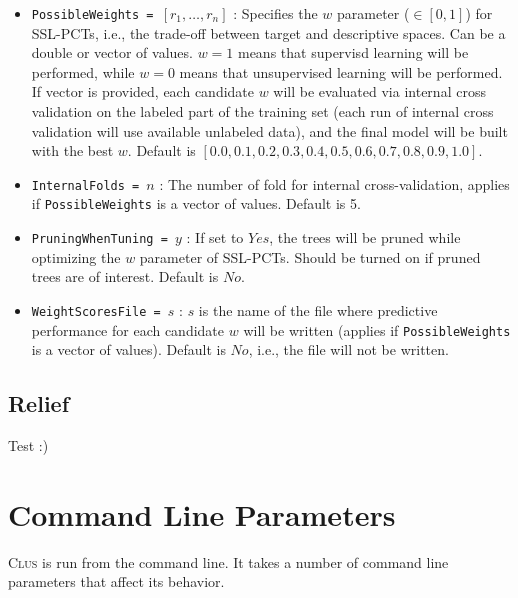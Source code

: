 \documentclass[a4paper]{report}
\newcommand{\clus}{\textsc{Clus}}
\newcommand{\optionListsFolder}{./optionListsForUse}
\begin{document}
\begin{itemize}
\item {\tt PossibleWeights = $\left[ r_1, \ldots, r_n\right]$} : Specifies the $w$ parameter ($\in [0,1]$) for SSL-PCTs, i.e., the trade-off between target and descriptive spaces. Can be a double or vector of values. $w=1$ means that supervisd learning will be performed, while $w=0$ means that unsupervised learning will be performed. If vector is provided, each candidate $w$ will be evaluated via internal cross validation on the labeled part of the training set (each run of internal cross validation will use available unlabeled data), and the final model will be built with the best $w$. Default is $[0.0,0.1,0.2,0.3,0.4,0.5,0.6,0.7,0.8,0.9,1.0]$.
\item {\tt InternalFolds = $n$} : The number of fold for internal cross-validation, applies if {\tt PossibleWeights} is a vector of values. Default is 5.
\item {\tt PruningWhenTuning = $y$} : If set to $Yes$, the trees will be pruned while optimizing the $w$ parameter of SSL-PCTs. Should be turned on if pruned trees are of interest. Default is $No$.
\item {\tt WeightScoresFile = $s$} : $s$ is the name of the file where predictive performance for each candidate $w$ will be written (applies if {\tt PossibleWeights} is a vector of values). Default is $No$, i.e., the file will not be written.
\end{itemize}

\section{Relief}
Test :)


\chapter{Command Line Parameters}
\label{param:ch}

\clus{} is run from the command line.  It takes a number of command line parameters that affect its behavior.
\end{document}
